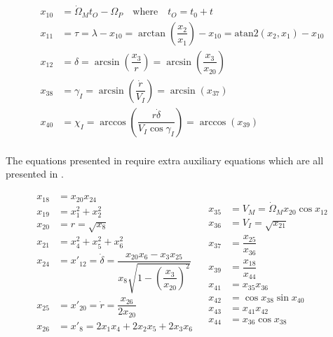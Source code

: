  \begin{equation} \label{eq:transAnglAux}
\begin{split}
x_{10} &= \dot{\Omega}_{M}t_{O}-\Omega_{P} \quad \text{where} \quad t_{O}=t_{0}+t \\
x_{11} &= \tau = \lambda - x_{10} = \arctan\left(\dfrac{x_{2}}{x_{1}}\right)-x_{10} = \text{atan2}\left(x_{2},x_{1}\right)-x_{10}\\
x_{12} &= \delta = \arcsin\left(\dfrac{x_{3}}{r}\right) = \arcsin\left(\dfrac{x_{3}}{x_{20}}\right)\\
x_{38} &= \gamma_{I} = \arcsin\left(\dfrac{\dot{r}}{V_{I}}\right) = \arcsin\left(x_{37}\right)\\
x_{40} &= \chi_{I} = \arccos\left(\dfrac{r \dot{\delta}}{V_{I} \cos \gamma_{I}}\right)=\arccos\left(x_{39}\right)\\
\end{split}
\end{equation} 

The equations presented in  require extra auxiliary equations which are all presented in .
 
 \begin{align} \label{eq:extraTransAnglAux}
\begin{split}
x_{18} &= x_{20}x_{24}\\
x_{19} &= x_{1}^{2}+x_{2}^{2}\\
x_{20} &= r = \sqrt{x_{8}} \\
x_{21} &= x_{4}^{2}+x_{5}^{2}+x_{6}^{2}\\
x_{24} &= x'_{12} = \dot{\delta} = \dfrac{x_{20}x_{6}-x_{3}x_{25}}{x_{8} \sqrt{1-\left(\dfrac{x_{3}}{x_{20}}\right)^{2}}}\\
x_{25} &= x'_{20}=\dot{r}=\dfrac{x_{26}}{2x_{20}}\\
x_{26} &= x'_{8}=2x_{1}x_{4}+2x_{2}x_{5}+2x_{3}x_{6}\\
\end{split}
&
\begin{split}
x_{35} &= V_{M} = \dot{\Omega}_{M} x_{20}\cos x_{12}\\
x_{36} &= V_{I} = \sqrt{x_{21}}\\
x_{37} &= \dfrac{x_{25}}{x_{36}}\\
x_{39} &= \dfrac{x_{18}}{x_{44}}\\
x_{41} &= x_{35}x_{36}\\
x_{42} &= \cos x_{38} \sin x_{40}\\
x_{43} &= x_{41}x_{42}\\
x_{44} &= x_{36} \cos x_{38}\\
\end{split}
\end{align}  

